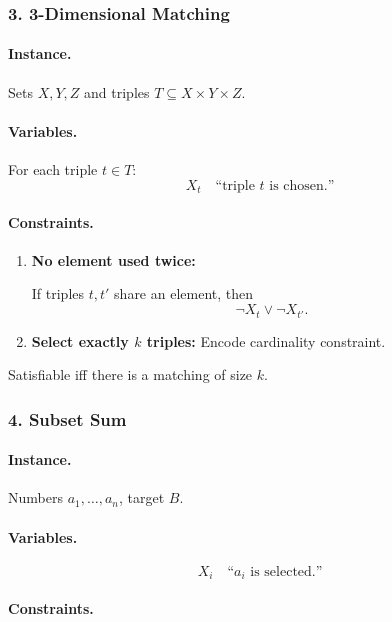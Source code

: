 \documentclass{article}
\begin{document}
\bigskip

\subsubsection*{3. 3-Dimensional Matching}

\paragraph{Instance.}
Sets $X,Y,Z$ and triples $T \subseteq X \times Y \times Z$.

\paragraph{Variables.}
For each triple $t \in T$:
\[
X_t \quad \text{``triple $t$ is chosen.''}
\]

\paragraph{Constraints.}

\begin{enumerate}
    \item \textbf{No element used twice:}

    If triples $t,t'$ share an element, then
    \[
    \neg X_t \lor \neg X_{t'}.
    \]

    \item \textbf{Select exactly $k$ triples:}
    Encode cardinality constraint.
\end{enumerate}

Satisfiable iff there is a matching of size $k$.

\bigskip

\subsubsection*{4. Subset Sum}

\paragraph{Instance.}
Numbers $a_1,\dots,a_n$, target $B$.

\paragraph{Variables.}
\[
X_i \quad \text{``$a_i$ is selected.''}
\]

\paragraph{Constraints.}
\end{document}
